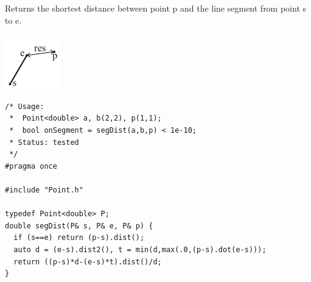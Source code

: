 \begin{minipage}{75mm}
Returns the shortest distance between point p and the line segment from point s to e.
\end{minipage}
\begin{minipage}{15mm}
\vspace{-10mm}
\includegraphics[width=\textwidth]{"../code/Geometry/2D Primitive/SegmentDistance"}
\end{minipage}
\begin{verbatim}
/* Usage: 
 *  Point<double> a, b(2,2), p(1,1);
 *  bool onSegment = segDist(a,b,p) < 1e-10;
 * Status: tested
 */
#pragma once

#include "Point.h"

typedef Point<double> P;
double segDist(P& s, P& e, P& p) {
  if (s==e) return (p-s).dist();
  auto d = (e-s).dist2(), t = min(d,max(.0,(p-s).dot(e-s)));
  return ((p-s)*d-(e-s)*t).dist()/d;
}

\end{verbatim}
